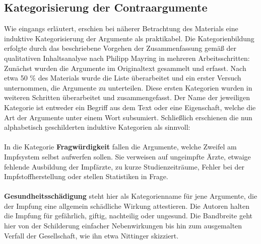 \documentclass[
    a4paper,
    12pt,
    hyphens,
    chapterprefix=true,
    headheight=33pt,
    footheight=29pt,
    headings=optiontohead, %
]{scrartcl}
\begin{document}
\subsection{Kategorisierung der Contraargumente}
Wie eingangs erläutert, erschien bei näherer Betrachtung des Materials eine induktive Kategorisierung der Argumente als praktikabel. Die Kategorienbildung erfolgte durch das beschriebene Vorgehen der Zusammenfassung gemäß der qualitativen Inhaltsanalyse nach  Philipp Mayring in mehreren Arbeitsschritten: Zunächst wurden die Argumente im Originaltext gesammelt und erfasst. Nach etwa 50 \% des Materials wurde die Liste überarbeitet und ein erster Versuch unternommen, die Argumente zu unterteilen. Diese ersten Kategorien wurden in weiteren Schritten überarbeitet und zusammengefasst. Der Name der jeweiligen Kategorie ist entweder ein Begriff aus dem Text oder eine Eigenschaft, welche die Art der Argumente unter einem Wort subsumiert. Schließlich erschienen die nun alphabetisch geschilderten induktive Kategorien als sinnvoll:\\
\\
In die Kategorie \textbf{Fragwürdigkeit} fallen die Argumente, welche Zweifel am Impfsystem selbst aufwerfen sollen. Sie verweisen auf ungeimpfte Ärzte, etwaige fehlende Ausbildung der Impfärzte, zu kurze Studienzeiträume, Fehler bei der Impfstoffherstellung oder stellen Statistiken in Frage.\\
\\
\textbf{Gesundheitsschädigung} steht hier als Kategorienname für jene Argumente, die der Impfung eine allgemein schädliche Wirkung attestieren. Die Autoren halten die Impfung für gefährlich, giftig, nachteilig oder ungesund. Die Bandbreite geht hier von der Schilderung einfacher Nebenwirkungen bis hin zum ausgemalten Verfall der Gesellschaft, wie ihn etwa Nittinger skizziert.\\
\end{document}
